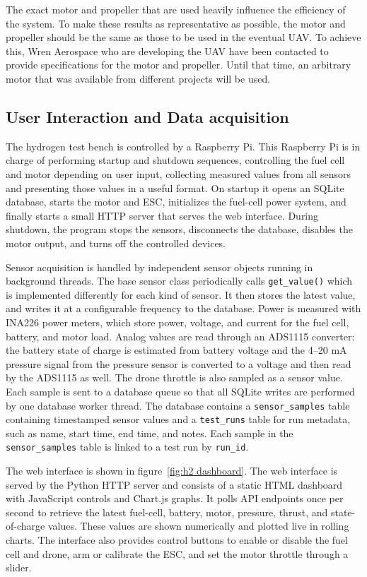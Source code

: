 The exact motor and propeller that are used heavily influence the efficiency of the system. To make these results as representative as possible, the motor and propeller should be the same as those to be used in the eventual UAV. To achieve this, Wren Aerospace who are developing the UAV have been contacted to provide specifications for the motor and propeller. Until that time, an arbitrary motor that was available from different projects will be used.

\clearpage
\subsection*{User Interaction and Data acquisition}
The hydrogen test bench is controlled by a Raspberry Pi. This Raspberry Pi is in charge of performing startup and shutdown sequences, controlling the fuel cell and motor depending on user input, collecting measured values from all sensors and presenting those values in a useful format.
On startup it opens an SQLite database, starts the motor and ESC, initializes the fuel-cell power system, and finally starts a small HTTP server that serves the web interface. During shutdown, the program stops the sensors, disconnects the database, disables the motor output, and turns off the controlled devices.

Sensor acquisition is handled by independent sensor objects running in background threads. The base sensor class periodically calls \texttt{get\_value()} which is implemented differently for each kind of sensor. It then stores the latest value, and writes it at a configurable frequency to the database. Power is measured with INA226 power meters, which store power, voltage, and current for the fuel cell, battery, and motor load. Analog values are read through an ADS1115 converter: the battery state of charge is estimated from battery voltage and the 4--20 mA pressure signal from the pressure sensor is converted to a voltage and then read by the ADS1115 as well. The drone throttle is also sampled as a sensor value. Each sample is sent to a database queue so that all SQLite writes are performed by one database worker thread. The database contains a \texttt{sensor\_samples} table containing timestamped sensor values and a \texttt{test\_runs} table for run metadata, such as name, start time, end time, and notes. Each sample in the \texttt{sensor\_samples} table is linked to a test run by \texttt{run\_id}.

The web interface is shown in figure~\ref{fig:h2 dashboard}. The web interface is served by the Python HTTP server and consists of a static HTML dashboard with JavaScript controls and Chart.js graphs. It polls API endpoints once per second to retrieve the latest fuel-cell, battery, motor, pressure, thrust, and state-of-charge values. These values are shown numerically and plotted live in rolling charts. The interface also provides control buttons to enable or disable the fuel cell and drone, arm or calibrate the ESC, and set the motor throttle through a slider.

